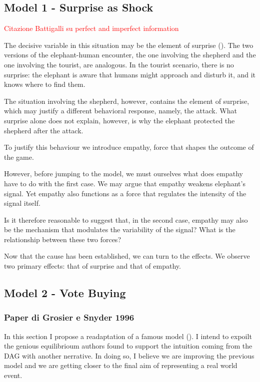 \newpage
\subsection*{Model 1 - Surprise as Shock}

\textcolor{red}{Citazione Battigalli su perfect and imperfect information}



\vspace*{1em}
The decisive variable in this situation may be the element of surprise (\cite{schellingStrategyConflict1960}).
The two versions of the elephant-human encounter, the one involving the shepherd and the one involving the tourist, are analogous. In the tourist scenario, there is no surprise: the elephant is aware that humans might approach and disturb it, and it knows where to find them.

The situation involving the shepherd, however, contains the element of surprise, which may justify a different behavioral response, namely, the attack. What surprise alone does not explain, however, is why the elephant protected the shepherd after the attack.

To justify this behaviour we introduce empathy, force that shapes the outcome of the game.

However, before jumping to the model, we must ourselves what does empathy have to do with the first case.
We may argue that empathy weakens elephant’s signal. Yet empathy also functions as a force that regulates the intensity of the signal itself.

Is it therefore reasonable to suggest that, in the second case, empathy may also be the mechanism that modulates the variability of the signal?
What is the relationship between these two forces?

Now that the cause has been established, we can turn to the effects.
We observe two primary effects: that of surprise and that of empathy.

\subsection*{Model 2 - Vote Buying}

\subsubsection*{Paper di Grosier e Snyder 1996}

In this section I propose a readaptation of a famous model (\cite{grosecloseBuyingSupermajorities1996}). I intend to expoilt the genious equilibrioum authors found to support the intuition coming from the DAG with another nerrative. In doing so, I believe we are improving the previous model and we are getting closer to the final aim of representing a real world event.

